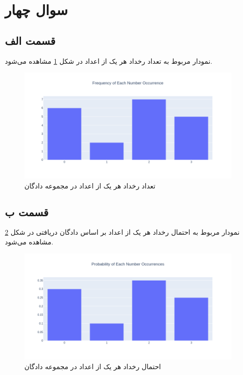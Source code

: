 \documentclass{article}
\begin{document}
\section*{سوال چهار}

\subsection*{قسمت الف}

نمودار مربوط به تعداد رخداد هر یک از اعداد در شکل \ref{frequency-of-each-number} مشاهده می‌شود.

\begin{figure}[h]
    \centering
    \includegraphics[scale=0.3]{images/q4/frequencies.png}
    \caption{تعداد رخداد هر یک از اعداد در مجموعه دادگان}
    \label{frequency-of-each-number}
\end{figure}

\subsection*{قسمت ب}

نمودار مربوط به احتمال رخداد هر یک از اعداد بر اساس دادگان دریافتی در شکل \ref{probability-of-each-number} مشاهده می‌شود.

\begin{figure}[h]
    \centering
    \includegraphics[scale=0.3]{images/q4/probability.png}
    \caption{احتمال رخداد هر یک از اعداد در مجموعه دادگان}
    \label{probability-of-each-number}
\end{figure}
\end{document}

